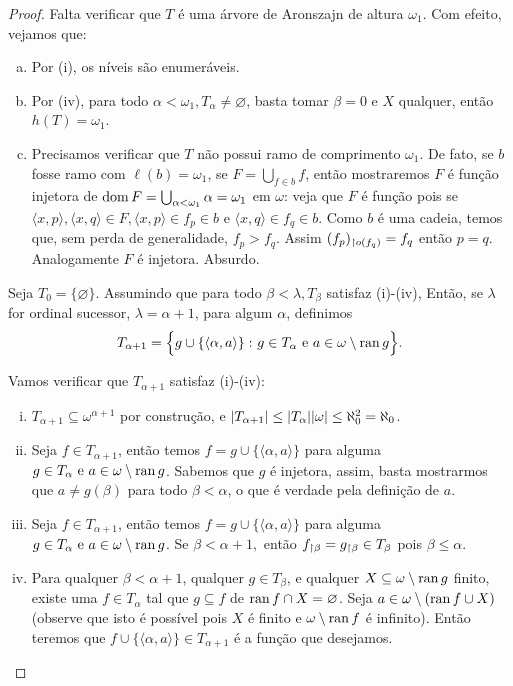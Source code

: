 \documentclass[a4paper]{article}
\begin{document}
\begin{proof}
    Falta verificar que \(T\) é uma árvore de Aronszajn de altura \(\omega_1\).
    Com efeito, vejamos que:
    \begin{enumerate}[(a)]
    \item Por (i), os níveis são enumeráveis.
     \item  Por (iv), para todo
    \(\alpha<\omega_1, T_\alpha\neq\varnothing\), basta tomar \(\beta=0\) e
    \(X\) qualquer,  então \(h(T)=\omega_1\).
    \item Precisamos verificar que \(T\) não
    possui ramo de comprimento \(\omega_1\). De fato, se \(b\) fosse ramo com
    \(\ell(b)=\omega_1\), se \(F=\bigcup_{f\in b} f\), então mostraremos \(F\) é
    função injetora de \(\operatorname{dom} F=\bigcup_{\alpha<\omega_1}\alpha=\omega_1\) em
    \(\omega\): veja que  \(F\) é função pois se \(\langle x,p\rangle,\langle
    x,q\rangle\in F,  \langle x,p\rangle\in f_p\in b\) e \(\langle x,q\rangle\in
    f_q\in b\). Como \(b\) é uma cadeia, temos que, sem perda de generalidade,
    \(f_p>f_q\). Assim \((f_p)_{\upharpoonright o(f_q)}=f_q\) então \(p=q\). Analogamente
    \(F\) é injetora. Absurdo.
    \end{enumerate}     
    
    Seja \(T_0=\{\varnothing\}\). Assumindo que para todo \(\beta<\lambda,
    T_\beta\) satisfaz (i)-(iv), Então, se \(\lambda\) for ordinal sucessor,
    \(\lambda=\alpha+1\), para algum \(\alpha\), definimos
    \[T_{\alpha+1}=\Big\{g\cup\{\langle \alpha, a\rangle\}\,\colon g\in
    T_\alpha \text{ e } a\in \omega\setminus\operatorname{ran} g\Big\}.\]
    
    Vamos verificar que \(T_{\alpha+1}\) satisfaz (i)-(iv):
    \begin{enumerate}[(i)]
    \item \(T_{\alpha+1}\subseteq\omega^{\alpha+1}\) por construção, e
      \(\vert T_{\alpha+1} \vert\leq\vert T_\alpha \vert\vert \omega \vert \le \aleph_0^2=\aleph_0\).
      \item Seja \(f\in T_{\alpha+1}\), então temos
        \(f=g\cup\{\langle\alpha,a\rangle\}\) 
        para alguma \(g\in T_\alpha \text{ e } a\in \omega\setminus\operatorname{ran} g\). Sabemos
        que \(g\) é injetora, assim, basta mostrarmos que \(a\neq g(\beta)\)
        para todo \(\beta<\alpha\), o que é verdade pela definição de \(a\).
      \item Seja \(f\in T_{\alpha+1}\), então temos
        \(f=g\cup\{\langle\alpha,a\rangle\}\) para
        alguma \(g\in T_\alpha \text{ e } a\in \omega\setminus\operatorname{ran} g\). Se
        \(\beta<\alpha+1,\) então \(f_{\upharpoonright \beta}=g_{\upharpoonright \beta}\in T_\beta\)
        pois \(\beta\leq\alpha\).
      \item Para qualquer \(\beta < \alpha+1\), qualquer \(g \in T_{\beta}\), e
    qualquer \(X \subseteq \omega\setminus \operatorname{ran} g\) finito, existe uma \(f \in
    T_{\alpha}\) tal que \(g \subseteq f\) de \(\operatorname{ran} f \cap X = \varnothing\).
    Seja \(a\in\omega\setminus(\operatorname{ran} f\cup X)\) (observe que isto
    é possível pois \(X\) é finito e \(\omega\setminus\operatorname{ran} f\) é infinito).
    Então teremos  que \(f\cup\{\langle\alpha,a\rangle\}\in T_{\alpha+1}\) é a
    função que desejamos.
    \end{enumerate}
      

\end{proof}
\end{document}
